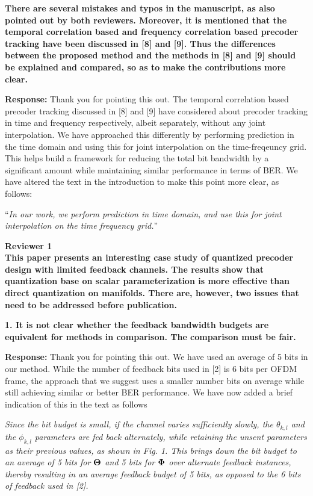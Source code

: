 \documentclass[12pt]{letter}
\begin{document}
\textbf{There are several mistakes and typos in the manuscript, as
  also pointed out by both reviewers. Moreover, it is mentioned that
  the temporal correlation based and frequency correlation based
  precoder tracking have been discussed in [8] and [9]. Thus the
  differences between the proposed method and the methods in [8] and
  [9] should be explained and compared, so as to make the
  contributions more clear.}

\textbf{Response:} Thank you for pointing this out. The temporal
correlation based precoder tracking discussed in [8] and [9] have
considered about precoder tracking in time and frequency respectively,
albeit separately, without any joint interpolation.  We have
approached this differently by performing prediction in the time
domain and using this for joint interpolation on the time-freqeuncy
grid. This helps build a framework for reducing the total bit
bandwidth by a significant amount while maintaining similar performance
in terms of BER.  We have altered the text in the introduction to make
this point more clear,  as follows:

``\emph{In our work, we perform prediction in time domain, and use this for joint
  interpolation on the time frequency grid.}''

\textbf{Reviewer 1}\\

\textbf{This paper presents an interesting case study of quantized
  precoder design with limited feedback channels. The results show
  that quantization base on scalar parameterization is more effective
  than direct quantization on manifolds. There are, however, two
  issues that need to be addressed before publication.}

\textbf{1. It is not clear whether the feedback bandwidth budgets are
equivalent for methods in comparison. The comparison must be fair.}

\textbf{Response:} Thank you for pointing this out. We have used an
average of 5 bits in our method. While the number of feedback bits
used in [2] is 6 bits per OFDM frame, the approach that we suggest
uses a smaller number bits on average while still achieving similar or
better BER performance. We have now added a brief indication of this
in the text as follows

\emph{Since the bit budget is small, if the channel varies
sufficiently slowly, the $\theta_{k,l}$ and the $\phi_{k,l}$ parameters
are fed back alternately, while retaining the unsent parameters as
their previous values, as shown in
Fig. 1. This brings down the bit budget to an average of 5 bits for
$\bf{\Theta}$ and 5 bits for $\bf{\Phi}$ over alternate feedback
instances, thereby resulting in an average feedback budget of 5 bits,
as opposed to the 6 bits of feedback used
in [2].}
\end{document}
